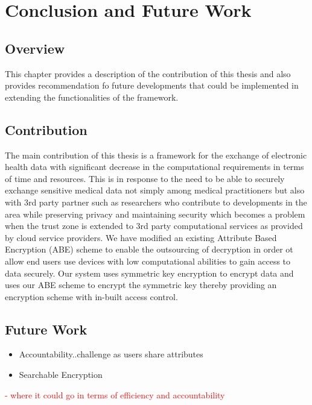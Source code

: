 \chapter{Conclusion and Future Work}
\label{chap:conclusions}

\section{Overview}

This chapter provides a description of the contribution of this thesis and also provides recommendation fo future developments that could be implemented in extending the functionalities of the framework.

\section{Contribution}

The main contribution of this thesis is a framework for the exchange of electronic health data with significant decrease in the computational requirements in terms of time and resources. This is in response to the need to be able to securely exchange sensitive medical data not simply among medical practitioners but also with 3rd party partner such as researchers who contribute to developments in the area while preserving privacy and maintaining security which becomes a problem when the trust zone is extended to 3rd party computational services as provided by cloud service providers. We have modified an existing Attribute Based Encryption (ABE) scheme to enable the outsourcing of decryption in order ot allow end users use devices with low computational abilities to gain access to data securely. Our system uses symmetric key encryption to encrypt data and uses our ABE scheme to encrypt the symmetric key thereby providing an encryption scheme with in-built access control.

\section{Future Work}

\begin{itemize}
	\item Accountability..challenge as users share attributes
	\item Searchable Encryption
	
\end{itemize}

\textcolor{red}{- where it could go in terms of efficiency and accountability}
